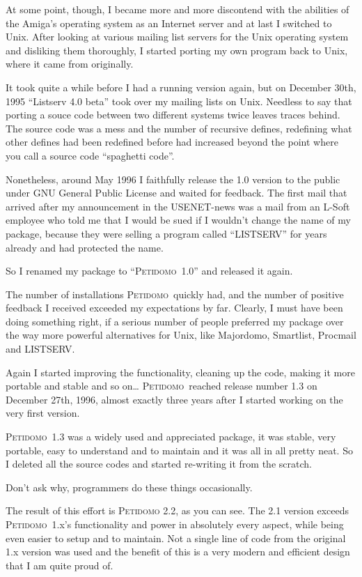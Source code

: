 \documentclass[a4paper,10pt]{scrreprt}
\newcommand{\Petidomo}{{\scshape Peti\-domo}}
\newcommand{\PetidomoTwo}{{\scshape Peti\-domo 2.2}}
\begin{document}
At some point, though, I became more and more discontend with the
abilities of the Amiga's operating system as an Internet server and at
last I switched to Unix. After looking at various mailing list servers
for the Unix operating system and disliking them thoroughly, I started
porting my own program back to Unix, where it came from originally.

It took quite a while before I had a running version again, but on
December 30th, 1995 ``Listserv 4.0 beta'' took over my mailing lists on
Unix. Needless to say that porting a souce code between two different
systems twice leaves traces behind. The source code was a mess and the
number of recursive defines, redefining what other defines had been
redefined before had increased beyond the point where you call a
source code ``spaghetti code''.

Nonetheless, around May 1996 I faithfully release the 1.0 version to
the public under GNU General Public License and waited for feedback.
The first mail that arrived after my announcement in the USENET-news
was a mail from an L-Soft employee who told me that I would be sued if
I wouldn't change the name of my package, because they were selling a
program called ``LISTSERV'' for years already and had protected the
name.

So I renamed my package to ``\Petidomo\ 1.0'' and released it again.

The number of installations \Petidomo\ quickly had, and the number of
positive feedback I received exceeded my expectations by far. Clearly,
I must have been doing something right, if a serious number of people
preferred my package over the way more powerful alternatives for Unix,
like Majordomo, Smartlist, Procmail and LISTSERV.

Again I started improving the functionality, cleaning up the code,
making it more portable and stable and so on\dots{} \Petidomo\ reached
release number 1.3 on December 27th, 1996, almost exactly three years
after I started working on the very first version.

\Petidomo\ 1.3 was a widely used and appreciated package, it was stable,
very portable, easy to understand and to maintain and it was all in
all pretty neat. So I deleted all the source codes and started
re-writing it from the scratch.

Don't ask why, programmers do these things occasionally.

The result of this effort is \PetidomoTwo, as you can see. The 2.1
version exceeds \Petidomo\ 1.x's functionality and power in absolutely
every aspect, while being even easier to setup and to maintain. Not a
single line of code from the original 1.x version was used and the
benefit of this is a very modern and efficient design that I am quite
proud of.
\end{document}
